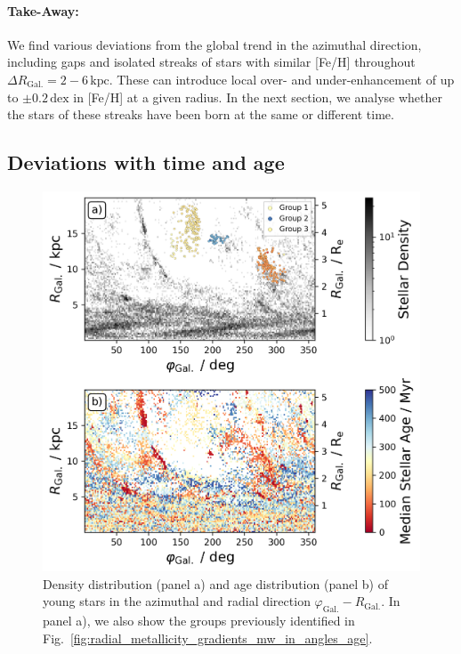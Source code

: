 \documentclass[fleqn,usenatbib]{mnras}
\begin{document}
\paragraph*{Take-Away:} We find various deviations from the global trend in the azimuthal direction, including gaps and isolated streaks of stars with similar [Fe/H] throughout $\Delta R_\mathrm{Gal.} = 2-6\,\mathrm{kpc}$. These can introduce local over- and under-enhancement of up to $\pm 0.2\,\mathrm{dex}$ in [Fe/H] at a given radius. In the next section, we analyse whether the stars of these streaks have been born at the same or different time.

\subsection{Deviations with time and age}
\label{sec:coherence_age_radial_metallicity_gradients}

\begin{figure}
    \centering
    \includegraphics[width=\columnwidth]{figures/phi_angle_R_follow_up.png}
    \caption{Density distribution (panel a) and age distribution (panel b) of young stars in the azimuthal and radial direction $\varphi_\mathrm{Gal.}-R_\mathrm{Gal.}$. In panel a), we also show the groups previously identified in Fig.~\ref{fig:radial_metallicity_gradients_mw_in_angles_age}.}
    \label{fig:phi_angle_R_follow_up}
\end{figure}
\end{document}
